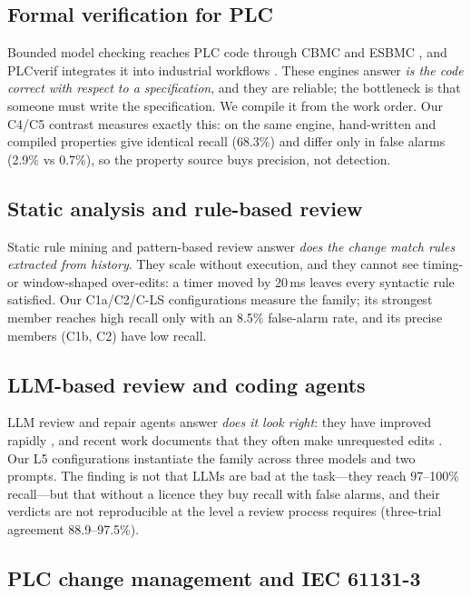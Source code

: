 \documentclass[acmsmall,screen,review,anonymous]{acmart}
\begin{document}
\subsection{Formal verification for PLC}

Bounded model checking reaches PLC code through CBMC and ESBMC \citep{cbmc,esbmc}, and PLCverif integrates it into industrial workflows \citep{plcverif}. These engines answer \emph{is the code correct with respect to a specification}, and they are reliable; the bottleneck is that someone must write the specification. We compile it from the work order. Our C4/C5 contrast measures exactly this: on the same engine, hand-written and compiled properties give identical recall (68.3\%) and differ only in false alarms (2.9\% vs 0.7\%), so the property source buys precision, not detection.

\subsection{Static analysis and rule-based review}

Static rule mining and pattern-based review answer \emph{does the change match rules extracted from history}. They scale without execution, and they cannot see timing- or window-shaped over-edits: a timer moved by 20\,ms leaves every syntactic rule satisfied. Our C1a/C2/C-LS configurations measure the family; its strongest member reaches high recall only with an 8.5\% false-alarm rate, and its precise members (C1b, C2) have low recall.

\subsection{LLM-based review and coding agents}

LLM review and repair agents answer \emph{does it look right}: they have improved rapidly \citep{codereviewer,swebench}, and recent work documents that they often make unrequested edits \citep{logrem}. Our L5 configurations instantiate the family across three models and two prompts. The finding is not that LLMs are bad at the task---they reach 97--100\% recall---but that without a licence they buy recall with false alarms, and their verdicts are not reproducible at the level a review process requires (three-trial agreement 88.9--97.5\%).

\subsection{PLC change management and IEC 61131-3}
\end{document}
